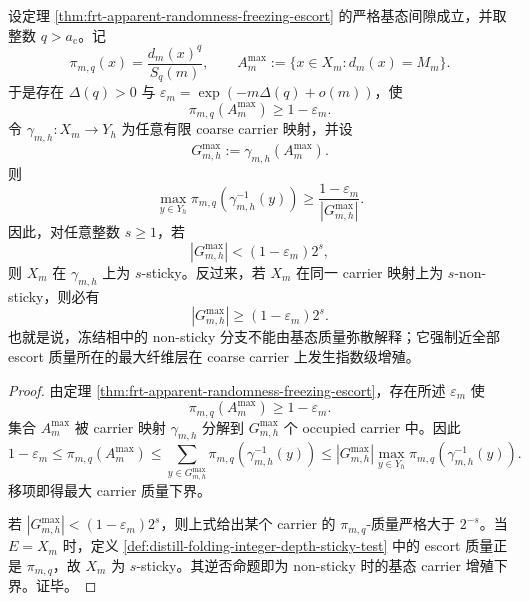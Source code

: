 \begin{proposition}\label{distill:wang_zahl-sticky_reduction_and_scale_saturated_closure-freezing-forces-sticky-or-groundstate-proliferation}
设定理 \ref{thm:frt-apparent-randomness-freezing-escort} 的严格基态间隙成立，并取整数 \(q>a_{\mathrm c}\)。记
\[
\pi_{m,q}(x)=\frac{d_m(x)^q}{S_q(m)},
\qquad
A_m^{\max}:=\{x\in X_m:d_m(x)=M_m\}.
\]
于是存在 \(\Delta(q)>0\) 与 \(\varepsilon_m=\exp(-m\Delta(q)+o(m))\)，使
\[
\pi_{m,q}(A_m^{\max})\ge1-\varepsilon_m.
\]
令 \(\gamma_{m,h}:X_m\to Y_h\) 为任意有限 coarse carrier 映射，并设
\[
G_{m,h}^{\max}:=\gamma_{m,h}(A_m^{\max}).
\]
则
\[
\max_{y\in Y_h}\pi_{m,q}(\gamma_{m,h}^{-1}(y))
\ge
\frac{1-\varepsilon_m}{|G_{m,h}^{\max}|}.
\]
因此，对任意整数 \(s\ge1\)，若
\[
|G_{m,h}^{\max}|<(1-\varepsilon_m)2^s,
\]
则 \(X_m\) 在 \(\gamma_{m,h}\) 上为 \(s\)-sticky。反过来，若 \(X_m\) 在同一 carrier 映射上为 \(s\)-non-sticky，则必有
\[
|G_{m,h}^{\max}|\ge(1-\varepsilon_m)2^s.
\]
也就是说，冻结相中的 non-sticky 分支不能由基态质量弥散解释；它强制近全部 escort 质量所在的最大纤维层在 coarse carrier 上发生指数级增殖。
\end{proposition}
\begin{proof}
由定理 \ref{thm:frt-apparent-randomness-freezing-escort}，存在所述 \(\varepsilon_m\) 使
\[
\pi_{m,q}(A_m^{\max})\ge1-\varepsilon_m.
\]
集合 \(A_m^{\max}\) 被 carrier 映射 \(\gamma_{m,h}\) 分解到 \(G_{m,h}^{\max}\) 个 occupied carrier 中。因此
\[
1-\varepsilon_m
\le
\pi_{m,q}(A_m^{\max})
\le
\sum_{y\in G_{m,h}^{\max}}
\pi_{m,q}(\gamma_{m,h}^{-1}(y))
\le
|G_{m,h}^{\max}|
\max_{y\in Y_h}\pi_{m,q}(\gamma_{m,h}^{-1}(y)).
\]
移项即得最大 carrier 质量下界。

若 \(|G_{m,h}^{\max}|<(1-\varepsilon_m)2^s\)，则上式给出某个 carrier 的 \(\pi_{m,q}\)-质量严格大于 \(2^{-s}\)。当 \(E=X_m\) 时，定义 \ref{def:distill-folding-integer-depth-sticky-test} 中的 escort 质量正是 \(\pi_{m,q}\)，故 \(X_m\) 为 \(s\)-sticky。其逆否命题即为 non-sticky 时的基态 carrier 增殖下界。证毕。
\end{proof}

